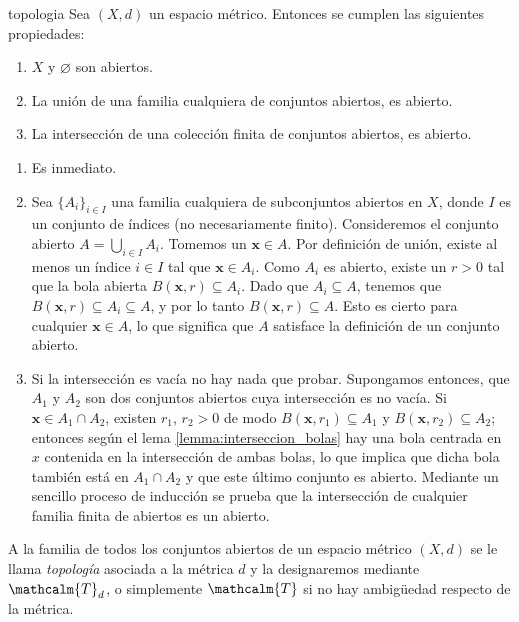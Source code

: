 \begin{theorem}{}{topologia}
    Sea $(X, d)$ un espacio métrico. Entonces se cumplen las siguientes propiedades:
    \begin{enumerate}[label=\roman*), topsep=6pt, itemsep=0pt]
        \item $X$ y $\varnothing$ son abiertos.
        \item La unión de una familia cualquiera de conjuntos abiertos, es abierto.
        \item La intersección de una colección finita de conjuntos abiertos, es abierto.
    \end{enumerate}
    \newpage
    \demostracion
    \begin{enumerate}[label=\roman*), topsep=6pt, itemsep=0pt]
        \item Es inmediato.
        \item Sea $\{A_i\}_{i \in I}$ una familia cualquiera de subconjuntos abiertos en $X$, donde $I$ es un conjunto de índices (no necesariamente finito). Consideremos el conjunto abierto $\displaystyle A = \bigcup_{i \in I} A_i$. Tomemos un $\mathbf{x} \in A$. Por definición de unión, existe al menos un índice $i \in I$ tal que $\mathbf{x} \in A_i$. Como $A_i$ es abierto, existe un $r > 0$ tal que la bola abierta $B(\mathbf{x}, r) \subseteq A_i$. Dado que $A_i \subseteq A$, tenemos que $B(\mathbf{x}, r) \subseteq A_i \subseteq A$, y por lo tanto $B(\mathbf{x}, r) \subseteq A$. Esto es cierto para cualquier $\mathbf{x} \in A$, lo que significa que $A$ satisface la definición de un conjunto abierto.
        \item Si la intersección es vacía no hay nada que probar. Supongamos entonces, que $A_1$ y $A_2$ son dos conjuntos abiertos cuya intersección es no vacía. Si $\mathbf{x} \in A_1 \cap A_2$, existen $r_1$, $r_2 > 0$ de modo $B(\mathbf{x}, r_1) \subseteq A_1$ y $B(\mathbf{x}, r_2) \subseteq A_2$; entonces según el lema \ref{lemma:interseccion_bolas} hay una bola centrada en $x$ contenida en la intersección de ambas bolas, lo que implica que dicha bola también está en $A_1 \cap A_2$ y que este último conjunto es abierto. Mediante un sencillo proceso de inducción se prueba que la intersección de cualquier familia finita de abiertos es un abierto.
    \end{enumerate}
\end{theorem}

A la familia de todos los conjuntos abiertos de un espacio métrico $(X, d)$ se le llama \emph{topología} asociada a la métrica $d$ y la designaremos mediante $\mathcalm{T}_d$, o simplemente $\mathcalm{T}$ si no hay ambigüedad respecto de la métrica.

